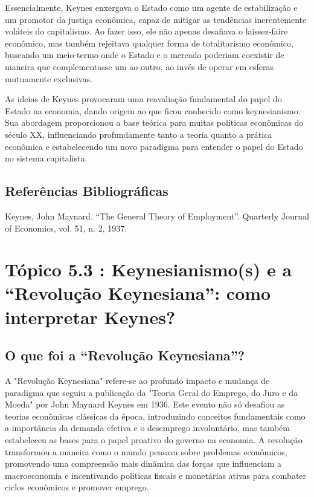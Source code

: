 \documentclass[12pt]{article}
\begin{document}
Essencialmente, Keynes enxergava o Estado como um agente de estabilização e um promotor da justiça econômica, capaz de mitigar as tendências inerentemente voláteis do capitalismo. Ao fazer isso, ele não apenas desafiava o laissez-faire econômico, mas também rejeitava qualquer forma de totalitarismo econômico, buscando um meio-termo onde o Estado e o mercado poderiam coexistir de maneira que complementasse um ao outro, ao invés de operar em esferas mutuamente exclusivas.

As ideias de Keynes provocaram uma reavaliação fundamental do papel do Estado na economia, dando origem ao que ficou conhecido como keynesianismo. Sua abordagem proporcionou a base teórica para muitas políticas econômicas do século XX, influenciando profundamente tanto a teoria quanto a prática econômica e estabelecendo um novo paradigma para entender o papel do Estado no sistema capitalista.

\subsection{\textbf{Referências Bibliográficas}}
Keynes, John Maynard. “The General Theory of Employment”. Quarterly Journal of Economics,
vol. 51, n. 2, 1937.

\section{\textbf{Tópico 5.3 : Keynesianismo(s) e a “Revolução Keynesiana”: como interpretar Keynes?}}
\subsection{\textbf{O que foi a “Revolução Keynesiana”?}}
A "Revolução Keynesiana" refere-se ao profundo impacto e mudança de paradigma que seguiu a publicação da "Teoria Geral do Emprego, do Juro e da Moeda" por John Maynard Keynes em 1936. Este evento não só desafiou as teorias econômicas clássicas da época, introduzindo conceitos fundamentais como a importância da demanda efetiva e o desemprego involuntário, mas também estabeleceu as bases para o papel proativo do governo na economia. A revolução transformou a maneira como o mundo pensava sobre problemas econômicos, promovendo uma compreensão mais dinâmica das forças que influenciam a macroeconomia e incentivando políticas fiscais e monetárias ativas para combater ciclos econômicos e promover emprego.
\end{document}
